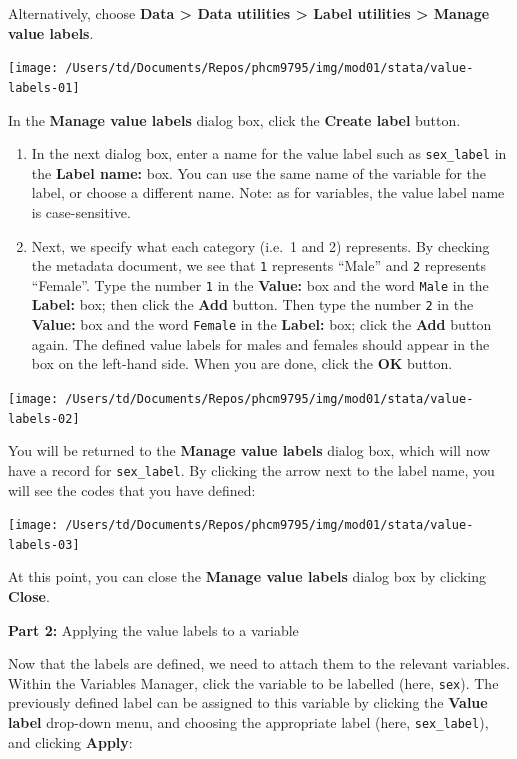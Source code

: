 \documentclass[
]{memoir}
\begin{document}
Alternatively, choose \textbf{Data \textgreater{} Data utilities \textgreater{} Label utilities \textgreater{} Manage value labels}.

\texttt{[image: /Users/td/Documents/Repos/phcm9795/img/mod01/stata/value-labels-01]}

In the \textbf{Manage value labels} dialog box, click the \textbf{Create label} button.

\begin{enumerate}
\def\labelenumi{\arabic{enumi}.}
\setcounter{enumi}{1}
\item
  In the next dialog box, enter a name for the value label such as \texttt{sex\_label} in the \textbf{Label name:} box. You can use the same name of the variable for the label, or choose a different name. Note: as for variables, the value label name is case-sensitive.
\item
  Next, we specify what each category (i.e.~1 and 2) represents. By checking the metadata document, we see that \texttt{1} represents ``Male'' and \texttt{2} represents ``Female''. Type the number \texttt{1} in the \textbf{Value:} box and the word \texttt{Male} in the \textbf{Label:} box; then click the \textbf{Add} button. Then type the number \texttt{2} in the \textbf{Value:} box and the word \texttt{Female} in the \textbf{Label:} box; click the \textbf{Add} button again. The defined value labels for males and females should appear in the box on the left-hand side. When you are done, click the \textbf{OK} button.
\end{enumerate}

\texttt{[image: /Users/td/Documents/Repos/phcm9795/img/mod01/stata/value-labels-02]}

You will be returned to the \textbf{Manage value labels} dialog box, which will now have a record for \texttt{sex\_label}. By clicking the arrow next to the label name, you will see the codes that you have defined:

\texttt{[image: /Users/td/Documents/Repos/phcm9795/img/mod01/stata/value-labels-03]}

At this point, you can close the \textbf{Manage value labels} dialog box by clicking \textbf{Close}.

\textbf{Part 2:} Applying the value labels to a variable

Now that the labels are defined, we need to attach them to the relevant variables. Within the Variables Manager, click the variable to be labelled (here, \texttt{sex}). The previously defined label can be assigned to this variable by clicking the \textbf{Value label} drop-down menu, and choosing the appropriate label (here, \texttt{sex\_label}), and clicking \textbf{Apply}:
\end{document}
